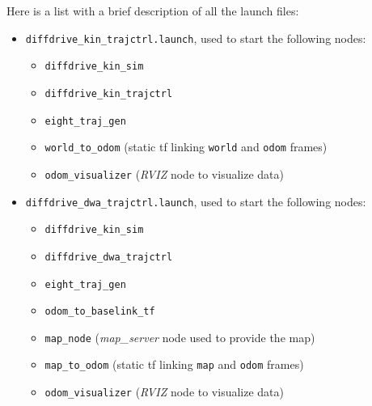 \documentclass[11pt,a4paper]{article}
\begin{document}
Here is a list with a brief description of all the launch files:\\
\begin{itemize}
    \item \texttt{diffdrive\_kin\_trajctrl.launch}, used to start the following nodes:
        \begin{itemize}
            \item \texttt{diffdrive\_kin\_sim}
            \item \texttt{diffdrive\_kin\_trajctrl}
            \item \texttt{eight\_traj\_gen}
            \item \texttt{world\_to\_odom} (static tf linking \texttt{world} and \texttt{odom} frames)
            \item \texttt{odom\_visualizer} (\textit{RVIZ} node to visualize data)\\
        \end{itemize}

    \item \texttt{diffdrive\_dwa\_trajctrl.launch}, used to start the following nodes:
        \begin{itemize}
            \item \texttt{diffdrive\_kin\_sim}
            \item \texttt{diffdrive\_dwa\_trajctrl}
            \item \texttt{eight\_traj\_gen}
            \item \texttt{odom\_to\_baselink\_tf}
            \item \texttt{map\_node} (\textit{map\_server} node used to provide the map)
            \item \texttt{map\_to\_odom} (static tf linking \texttt{map} and \texttt{odom} frames)
            \item \texttt{odom\_visualizer} (\textit{RVIZ} node to visualize data)
        \end{itemize}
\end{itemize}
\end{document}

